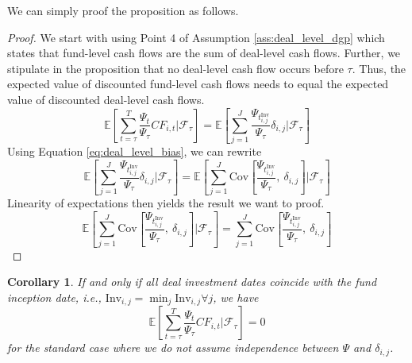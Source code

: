 \documentclass[12pt]{article}
\newtheorem{corollary}{Corollary}
\begin{document}
We can simply proof the proposition as follows.
\begin{proof}
		We start with using Point 4 of Assumption \ref{ass:deal_level_dgp} which states that fund-level cash flows are the sum of deal-level cash flows.
		Further, we stipulate in the proposition that no deal-level cash flow occurs before $\tau$.
		Thus, the expected value of discounted fund-level cash flows needs to equal the expected value of discounted deal-level cash flows. 
		\begin{equation}
		\label{eq:price_pooled_cash_flows_proof_1}
		\mathbb{E} \left[ 
		\sum_{t = \tau}^T
		\frac{\Psi_{t}}{\Psi_{\tau}}
		{CF}_{i,t}
		\left| \mathcal{F}_{\tau} \right.
		\right]
		=
		\mathbb{E} \left[ 
		\sum_{j=1}^J
		\frac{\Psi_{t_{i,j}^{\mathrm{Inv}}}}{\Psi_{\tau}}
		\delta_{i,j}
		\left| \mathcal{F}_{\tau} \right.
		\right]
	\end{equation}
	Using Equation \ref{eq:deal_level_bias}, we can rewrite
	\begin{equation}
		\label{eq:price_pooled_cash_flows_proof_2}
		\mathbb{E} \left[ 
		\sum_{j=1}^J
		\frac{\Psi_{t_{i,j}^{\mathrm{Inv}}}}{\Psi_{\tau}}
		\delta_{i,j}
		\left| \mathcal{F}_{\tau} \right.
		\right]
		=
		\mathbb{E} \left[ 
		\sum_{j=1}^J
		\mathrm{Cov} \left[ \frac{\Psi_{t_{i,j}^{\mathrm{Inv}}}}{\Psi_{\tau}}, \ \delta_{i,j} \right]
		\left| \mathcal{F}_{\tau} \right.
		\right]
	\end{equation}
	Linearity of expectations then yields the result we want to proof.
		\begin{equation}
		\label{eq:price_pooled_cash_flows_proof_3}
		\mathbb{E} \left[ 
		\sum_{j=1}^J
		\mathrm{Cov} \left[ \frac{\Psi_{t_{i,j}^{\mathrm{Inv}}}}{\Psi_{\tau}}, \ \delta_{i,j} \right]
		\left| \mathcal{F}_{\tau} \right.
		\right]
		=
		\sum_{j=1}^J
		\mathrm{Cov} \left[ \frac{\Psi_{t_{i,j}^{\mathrm{Inv}}}}{\Psi_{\tau}}, \ \delta_{i,j} \right]
	\end{equation}
\end{proof}


\begin{corollary}
	\label{cor:same_investment_dates}
	If and only if all deal investment dates coincide with the fund inception date, i.e., $\mathrm{Inv}_{i,j} = \min_j \mathrm{Inv}_{i,j} \forall j$, we have
	\begin{equation}
		\label{eq:price_pooled_cash_flows_corollary}
		\mathbb{E} \left[ 
		\sum_{t = \tau}^T
		\frac{\Psi_{t}}{\Psi_{\tau}}
		{CF}_{i,t}
		\left| \mathcal{F}_{\tau} \right.
		\right]
		=
		0
	\end{equation}
	for the standard case where we do not assume independence between $\Psi$ and $\delta_{i,j}$.
\end{corollary}
\end{document}

